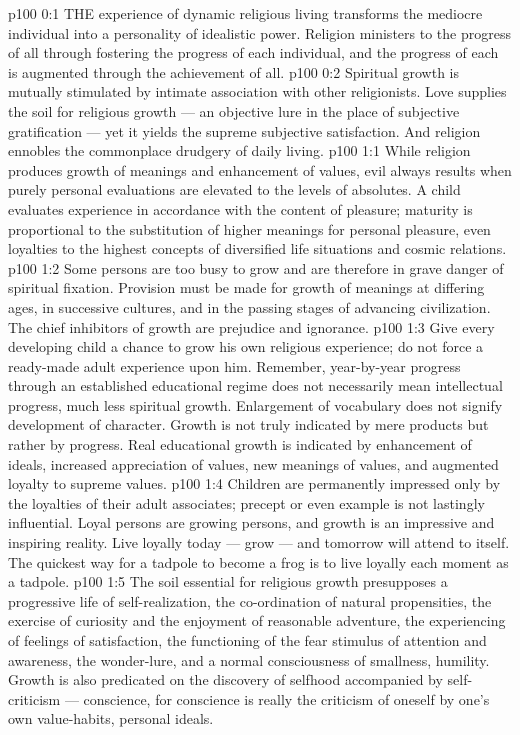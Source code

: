 \vs p100 0:1 THE experience of dynamic religious living transforms the mediocre individual into a personality of idealistic power. Religion ministers to the progress of all through fostering the progress of each individual, and the progress of each is augmented through the achievement of all.
\vs p100 0:2 Spiritual growth is mutually stimulated by intimate association with other religionists. Love supplies the soil for religious growth --- an objective lure in the place of subjective gratification --- yet it yields the supreme subjective satisfaction. And religion ennobles the commonplace drudgery of daily living.
\vs p100 1:1 While religion produces growth of meanings and enhancement of values, evil always results when purely personal evaluations are elevated to the levels of absolutes. A child evaluates experience in accordance with the content of pleasure; maturity is proportional to the substitution of higher meanings for personal pleasure, even loyalties to the highest concepts of diversified life situations and cosmic relations.
\vs p100 1:2 Some persons are too busy to grow and are therefore in grave danger of spiritual fixation. Provision must be made for growth of meanings at differing ages, in successive cultures, and in the passing stages of advancing civilization. The chief inhibitors of growth are prejudice and ignorance.
\vs p100 1:3 Give every developing child a chance to grow his own religious experience; do not force a ready\hyp{}made adult experience upon him. Remember, year\hyp{}by\hyp{}year progress through an established educational regime does not necessarily mean intellectual progress, much less spiritual growth. Enlargement of vocabulary does not signify development of character. Growth is not truly indicated by mere products but rather by progress. Real educational growth is indicated by enhancement of ideals, increased appreciation of values, new meanings of values, and augmented loyalty to supreme values.
\vs p100 1:4 Children are permanently impressed only by the loyalties of their adult associates; precept or even example is not lastingly influential. Loyal persons are growing persons, and growth is an impressive and inspiring reality. Live loyally today --- grow --- and tomorrow will attend to itself. The quickest way for a tadpole to become a frog is to live loyally each moment as a tadpole.
\vs p100 1:5 \pc The soil essential for religious growth presupposes a progressive life of self\hyp{}realization, the co\hyp{}ordination of natural propensities, the exercise of curiosity and the enjoyment of reasonable adventure, the experiencing of feelings of satisfaction, the functioning of the fear stimulus of attention and awareness, the wonder\hyp{}lure, and a normal consciousness of smallness, humility. Growth is also predicated on the discovery of selfhood accompanied by self\hyp{}criticism --- conscience, for conscience is really the criticism of oneself by one’s own value\hyp{}habits, personal ideals.

